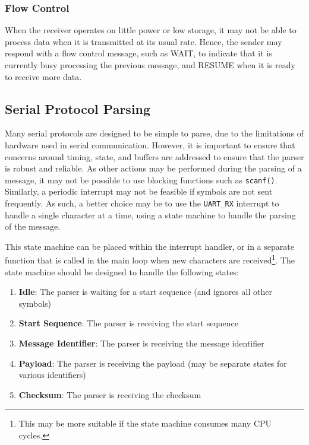 \documentclass{article}
\begin{document}
\subsubsection{Flow Control}
When the receiver operates on little power or low storage, it may not be
able to process data when it is transmitted at its usual rate. Hence,
the sender may respond with a flow control message, such as WAIT, to
indicate that it is currently busy processing the previous message, and
RESUME when it is ready to receive more data.
\subsection{Serial Protocol Parsing}
Many serial protocols are designed to be simple to parse, due to the
limitations of hardware used in serial communication. However, it is
important to ensure that concerns around timing, state, and buffers are
addressed to ensure that the parser is robust and reliable. As other
actions may be performed during the parsing of a message, it may not be
possible to use blocking functions such as \texttt{scanf()}.
Similarly, a periodic interrupt may not be feasible if symbols are not
sent frequently. As such, a better choice may be to use the
\texttt{UART_RX} interrupt to handle a single character at a
time, using a state machine to handle the parsing of the message.

This state machine can be placed within the interrupt handler, or in a
separate function that is called in the main loop when new characters
are received\footnote{This may be more suitable if the state machine
consumes many CPU cycles.}. The state machine should be designed to
handle the following states:
\begin{enumerate}
    \item \textbf{Idle}: The parser is waiting for a start sequence (and ignores all other symbols)
    \item \textbf{Start Sequence}: The parser is receiving the start sequence
    \item \textbf{Message Identifier}: The parser is receiving the message identifier
    \item \textbf{Payload}: The parser is receiving the payload (may be separate states for various identifiers)
    \item \textbf{Checksum}: The parser is receiving the checksum
\end{enumerate}
\end{document}
